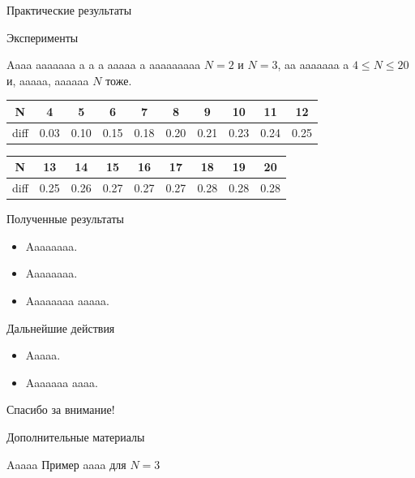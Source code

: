\documentclass{beamer}
\begin{document}
\begin{frame}{Практические результаты}
\begin{block}{Эксперименты}

Aaaa aaaaaaa a a a aaaaa a aaaaaaaaa $N = 2$ и $N = 3$, aa aaaaaaa a $4 \leq N \leq 20$ и, aaaaa, aaaaaa $N$ тоже.

\begin{table}
\begin{center}
\begin{tabular}{|c|c|c|c|c|c|c|c|c|c|} \hline
N    & 4    & 5    & 6    & 7    & 8    & 9    & 10   & 11   & 12   \\\hline
diff & 0.03 & 0.10 & 0.15 & 0.18 & 0.20 & 0.21 & 0.23 & 0.24 & 0.25 \\\hline
\end{tabular}
\end{center}
\end{table}
\begin{table}
\begin{center}
\begin{tabular}{|c|c|c|c|c|c|c|c|c|} \hline
N    & 13   & 14   & 15   & 16   & 17   & 18   & 19   & 20   \\\hline
diff & 0.25 & 0.26 & 0.27 & 0.27 & 0.27 & 0.28 & 0.28 & 0.28 \\\hline
\end{tabular}
\end{center}
\end{table}
\end{block}
\end{frame}


\begin{frame}{Полученные результаты}
\begin{block}{}
\begin{itemize}
\item Aaaaaaaa.
\item Aaaaaaaa.
\item Aaaaaaaa aaaaa.
\end{itemize}
\end{block}
\end{frame}

\begin{frame}{Дальнейшие действия}
\begin{block}{}
\begin{itemize}
\item Aaaaa.
\item Aaaaaaa aaaa.
\end{itemize}
\end{block}
\end{frame}

\begin{frame}{}
\begin{center}
Спасибо за внимание!
\end{center}
\end{frame}

\begin{frame}{Дополнительные материалы}
\begin{block}{Aaaaa}
Пример aaaa для $N = 3$
\begin{center}
\end{center}
\end{block}
\end{frame}
\end{document}
